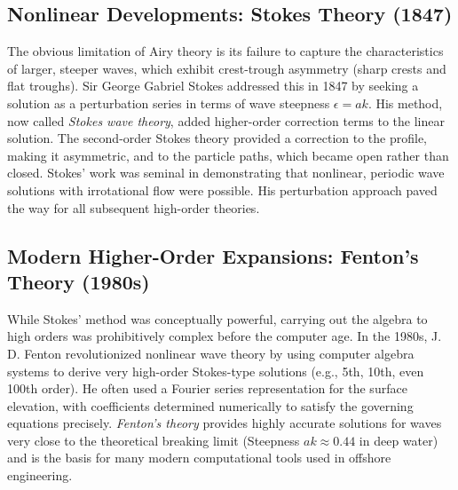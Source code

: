 \documentclass[11pt,letterpaper]{article}
\begin{document}
    \subsection{Nonlinear Developments: Stokes Theory (1847)}
    The obvious limitation of Airy theory is its failure to capture the characteristics of larger, steeper waves, which exhibit crest-trough asymmetry (sharp crests and flat troughs). Sir George Gabriel Stokes addressed this in 1847 by seeking a solution as a perturbation series in terms of wave steepness $\epsilon = ak$. His method, now called \emph{Stokes wave theory}, added higher-order correction terms to the linear solution. The second-order Stokes theory provided a correction to the profile, making it asymmetric, and to the particle paths, which became open rather than closed. Stokes' work was seminal in demonstrating that nonlinear, periodic wave solutions with irrotational flow were possible. His perturbation approach paved the way for all subsequent high-order theories.

    \subsection{Modern Higher-Order Expansions: Fenton's Theory (1980s)}
    While Stokes' method was conceptually powerful, carrying out the algebra to high orders was prohibitively complex before the computer age. In the 1980s, J. D. Fenton revolutionized nonlinear wave theory by using computer algebra systems to derive very high-order Stokes-type solutions (e.g., 5th, 10th, even 100th order). He often used a Fourier series representation for the surface elevation, with coefficients determined numerically to satisfy the governing equations precisely. \emph{Fenton's theory} provides highly accurate solutions for waves very close to the theoretical breaking limit (Steepness $ak \approx 0.44$ in deep water) and is the basis for many modern computational tools used in offshore engineering.
\end{document}
